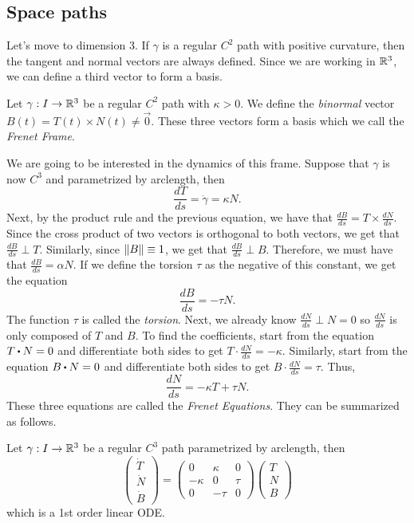 \subsection{Space paths}

Let's move to dimension 3. If $\gamma$ is a regular $C^2$ path with positive curvature, then the tangent and normal vectors are always defined. Since we are working in $\mathbb{R}^3$, we can define a third vector to form a basis.

\begin{definition}
    Let $\gamma : I \to \mathbb{R}^3$ be a regular $C^2$ path with $\kappa > 0$. We define the \textit{binormal} vector $B(t) = T(t) \times N(t) \neq \vec{0}$. These three vectors form a basis which we call the \textit{Frenet Frame}.
\end{definition}

We are going to be interested in the dynamics of this frame. Suppose that $\gamma$ is now $C^3$ and parametrized by arclength, then 
$$\frac{dT}{ds} = \ddot{\gamma} = \kappa N.$$
Next, by the product rule and the previous equation, we have that $\frac{dB}{ds} = T \times \frac{dN}{ds}$. Since the cross product of two vectors is orthogonal to both vectors, we get that $\frac{dB}{ds} \perp T$. Similarly, since $\left\lVert B \right\rVert \equiv 1$, we get that $\frac{dB}{ds} \perp B$. Therefore, we must have that $\frac{dB}{ds} = \alpha N$. If we define the torsion $\tau$ as the negative of this constant, we get the equation
$$\frac{dB}{ds} = - \tau N.$$
The function $\tau$ is called the \textit{torsion}. Next, we already know $\frac{dN}{ds}\perp N = 0$ so $\frac{dN}{ds}$ is only composed of $T$ and $B$. To find the coefficients, start from the equation $T \bigcdot N = 0$ and differentiate both sides to get $T \cdot \frac{dN}{ds} = - \kappa$. Similarly, start from the equation $B \bigcdot N = 0$ and differentiate both sides to get $B \cdot \frac{dN}{ds} = \tau$. Thus, 
$$\frac{dN}{ds} = -\kappa T + \tau N .$$
These three equations are called the \textit{Frenet Equations}. They can be summarized as follows.

\begin{theorem}
    Let $\gamma : I \to \mathbb{R}^3$ be a regular $C^3$ path parametrized by arclength, then
    $$\begin{pmatrix}
        \dot{T} \\ \dot{N} \\ \dot{B}
    \end{pmatrix} = \begin{pmatrix}
        0 & \kappa & 0 \\ -\kappa & 0 & \tau \\ 0 & - \tau & 0
    \end{pmatrix} \begin{pmatrix}
        T \\ N \\ B
    \end{pmatrix}$$
    which is a 1st order linear ODE.
\end{theorem}

